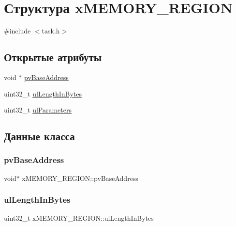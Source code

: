 \hypertarget{structx_m_e_m_o_r_y___r_e_g_i_o_n}{}\section{Структура x\+M\+E\+M\+O\+R\+Y\+\_\+\+R\+E\+G\+I\+ON}
\label{structx_m_e_m_o_r_y___r_e_g_i_o_n}


{\ttfamily \#include $<$task.\+h$>$}

\subsection*{Открытые атрибуты}
\begin{DoxyCompactItemize}
\item 
void $\ast$ \mbox{\hyperlink{structx_m_e_m_o_r_y___r_e_g_i_o_n_a228036bbfdbc38f170e45deadb166172}{pv\+Base\+Address}}
\item 
uint32\+\_\+t \mbox{\hyperlink{structx_m_e_m_o_r_y___r_e_g_i_o_n_a97e59578d3c4c46270d33e7206258a65}{ul\+Length\+In\+Bytes}}
\item 
uint32\+\_\+t \mbox{\hyperlink{structx_m_e_m_o_r_y___r_e_g_i_o_n_a6ba180553e9a318f23acc5f4664934e3}{ul\+Parameters}}
\end{DoxyCompactItemize}


\subsection{Данные класса}
\mbox{\label{structx_m_e_m_o_r_y___r_e_g_i_o_n_a228036bbfdbc38f170e45deadb166172}} 
\subsubsection{\texorpdfstring{pvBaseAddress}{pvBaseAddress}}
{\footnotesize\ttfamily void$\ast$ x\+M\+E\+M\+O\+R\+Y\+\_\+\+R\+E\+G\+I\+O\+N\+::pv\+Base\+Address}

\mbox{\label{structx_m_e_m_o_r_y___r_e_g_i_o_n_a97e59578d3c4c46270d33e7206258a65}} 
\subsubsection{\texorpdfstring{ulLengthInBytes}{ulLengthInBytes}}
{\footnotesize\ttfamily uint32\+\_\+t x\+M\+E\+M\+O\+R\+Y\+\_\+\+R\+E\+G\+I\+O\+N\+::ul\+Length\+In\+Bytes}

